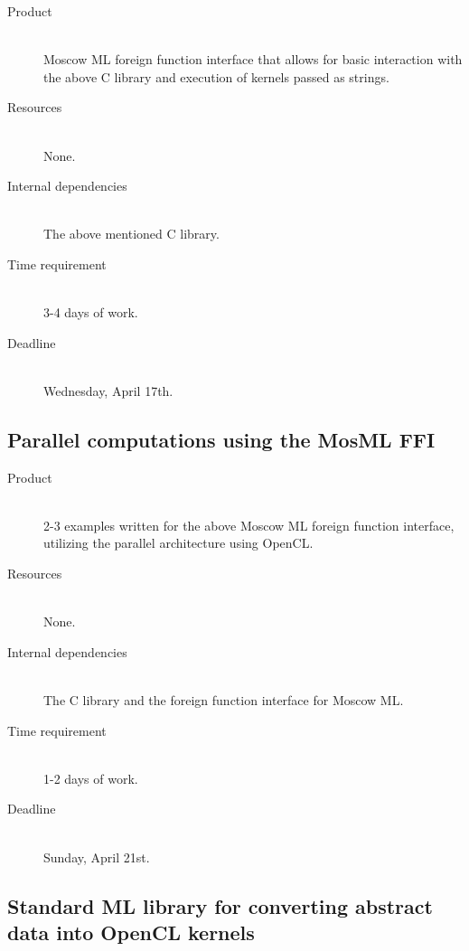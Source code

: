 \documentclass[a4paper, 10pt]{article}
\begin{document}
\begin{description}
  \item[Product] \hfill \\
    Moscow ML foreign function interface that allows for basic
    interaction with the above C library and execution of kernels
    passed as strings.
  \item[Resources] \hfill \\
    None.
  \item[Internal dependencies] \hfill \\
    The above mentioned C library.
  \item[Time requirement] \hfill \\
    3-4 days of work.
  \item[Deadline] \hfill \\
    Wednesday, April 17th.
\end{description}

\subsection{Parallel computations using the MosML FFI}

\begin{description}
  \item[Product] \hfill \\
    2-3 examples written for the above Moscow ML foreign function
    interface, utilizing the parallel architecture using OpenCL.
  \item[Resources] \hfill \\
    None.
  \item[Internal dependencies] \hfill \\
    The C library and the foreign function interface for Moscow ML.
  \item[Time requirement] \hfill \\
    1-2 days of work.
  \item[Deadline] \hfill \\
    Sunday, April 21st.
\end{description}

\subsection{Standard ML library for converting abstract data into
  OpenCL kernels}
\end{document}
